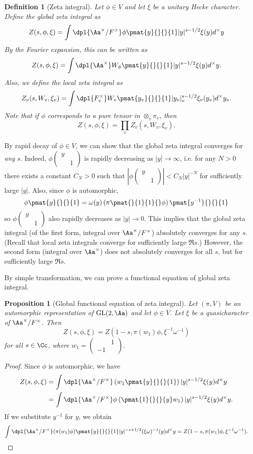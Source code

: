 \documentclass{article}
\newtheorem{definition}{Definition}[section]
\newcommand{\GL}{\mathrm{GL}}
\newcommand{\smat}[4]{\left(\begin{smallmatrix} #1 & #2 \\ #3 & #4 \end{smallmatrix}\right)}
\newtheorem{proposition}{Proposition}[section]
\begin{document}
\begin{definition}[Zeta integral]
Let $\phi\in V$ and let $\xi$ be a unitary Hecke character. Define the global zeta integral as
$$
Z(s, \phi, \xi) = \int\dpl{\Aa^{\times}/F^{\times}} \phi\pmat{y}{}{}{1} |y|^{s-1/2} \xi(y) d^{\times}y
$$
By the Fourier expansion, this can be written as
$$
Z(s, \phi, \xi) = \int\dpl{\Aa^{\times}} W_{\phi}\pmat{y}{}{}{1} |y|^{s-1/2} \xi(y) d^{\times}y. 
$$
Also, we define the local zeta integral as 
$$
Z_{v}(s, W_{v}, \xi_{v}) = \int\dpl{F_{v}^{\times}} W_{v}\pmat{y_{v}}{}{}{1} |y_{v}|_{v}^{s-1/2} \xi_{v}(y_{v})d^{\times}y_{v}. 
$$
Note that if $\phi$ corresponds to a pure tensor in $\otimes_{v}\pi_{v}$, then 
$$
Z(s, \phi, \xi) =\prod_{v} Z_{v}(s, W_{v}, \xi_{v}). 
$$
\end{definition}
By rapid decay of $\phi\in V$, we can show that the global zeta integral converges for \emph{any} $s$. 
Indeed, $\phi\smat{y}{}{}{1}$ is rapidly decreasing as $|y| \to \infty$, i.e. for any $N>0$ there exists a constant $C_N>0$ such that $|\phi\smat{y}{}{}{1}| < C_{N}|y|^{-N}$ for sufficiently large $|y|$. 
Also, since $\phi$ is automorphic, 
$$
\phi\pmat{y}{}{}{1} = \omega(y) \left( \pi \pmat{}{1}{1}{} \phi\right) \pmat{y^{-1}}{}{}{1}
$$
so $\phi\smat{y}{}{}{1}$ also rapidly decreases as $|y|\to 0$. 
This implies that the global zeta integral (of the first form, integral over $\Aa^{\times} / F^{\times}$) absolutely converges for any $s$. (Recall that local zeta integrals converge for sufficiently large $\Re s$.) However, the second form (integral over $\Aa^{\times}$) does not absolutely converges for all $s$, but for sufficiently large $\Re s$. 

By simple transformation, we can prove a functional equation of global zeta integral. 
\begin{proposition}[Global functional equation of zeta integral]
Let $(\pi, V)$ be an automorphic representation of $\GL(2, \Aa)$ and let $\phi \in V$. 
Let $\xi$ be a quasicharacter of $\Aa^{\times}/F^{\times}$. 
Then 
$$
Z(s, \phi, \xi) = Z(1-s, \pi(w_1)\phi, \xi^{-1} \omega^{-1})
$$
for all $s\in \Cc$, where $w_1 = \smat{}{1}{-1}{}$. 
\end{proposition}
\begin{proof}
Since $\phi$ is automorphic, we have
\begin{align*}
Z(s, \phi, \xi) &= \int\dpl{\Aa^{\times}/F^{\times}} \left( w_1 \pmat{y}{}{}{1} \right) |y|^{s-1/2} \xi(y)d^{\times} y \\
&= \int\dpl{\Aa^{\times}/F^{\times}} \phi\left( \pmat{1}{}{}{y} w_{1}\right) |y|^{s-1/2} \xi(y) d^{\times} y.
\end{align*}
If we substitute $y^{-1}$ for $y$, we obtain
$$
\int\dpl{\Aa^{\times}/F^{\times}} (\pi(w_1)\phi)\pmat{y}{}{}{1} |y|^{-s+1/2} (\xi \omega)^{-1}(y)d^{\times}y = Z(1-s, \pi(w_1)\phi, \xi^{-1}\omega^{-1}). 
$$
\end{proof}
 
\end{document}
